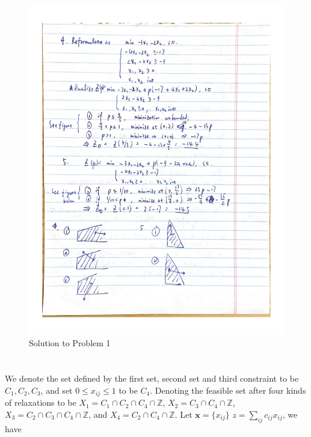 \documentclass{article}
\newcommand{\x}{\bm x}
\begin{document}
\begin{figure}[!ht]
    \includegraphics[width=\textwidth]{1.2.png}
    \caption{Solution to Problem 1}
\end{figure}
\section{}
\section{}
We denote the set defined by the first set, second set and third constraint to be $C_1,C_2,C_3$, and set $0\le x_{ij}\le 1$ to be $C_4$. Denoting the feasible set after four kinds of relaxations to be $X_1=C_1\cap C_2\cap C_4\cap\mathbb Z$, $X_2=C_3\cap C_4\cap\mathbb Z$, $X_3=C_2\cap C_3\cap C_4\cap\mathbb Z$, and $X_4=C_2\cap C_4\cap\mathbb Z$. Let $\x=\{x_{ij}\}$ $z=\sum_{ij}c_{ij}x_{ij}$, we have
\end{document}
